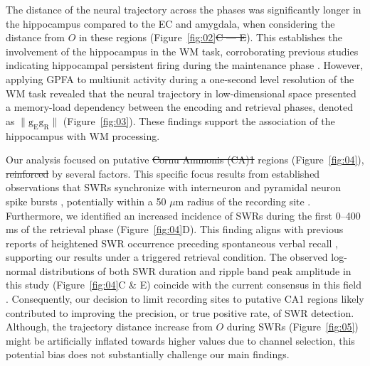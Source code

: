 \documentclass[final,3p,times,twocolumn]{elsarticle}
\providecommand{\DIFaddtex}[1]{{\protect\color{blue}\uwave{#1}}} %
\providecommand{\DIFdeltex}[1]{{\protect\color{red}\sout{#1}}}                      %
\providecommand{\DIFaddbegin}{} %
\providecommand{\DIFaddend}{} %
\providecommand{\DIFdelbegin}{} %
\providecommand{\DIFdelend}{} %
\providecommand{\DIFadd}[1]{\texorpdfstring{\DIFaddtex{#1}}{#1}} %
\providecommand{\DIFdel}[1]{\texorpdfstring{\DIFdeltex{#1}}{}} %
\newcommand{\DIFscaledelfig}{0.5}
\newlength{\DIFdelgraphicswidth} %
\newlength{\DIFdelgraphicsheight} %
\newcommand{\DIFaddincludegraphics}[2][]{{\color{blue}\fbox{\DIFOincludegraphics[#1]{#2}}}} %
\newcommand{\DIFdelincludegraphics}[2][]{%
\sbox{\DIFdelgraphicsbox}{\DIFOincludegraphics[#1]{#2}}%
\settoboxwidth{\DIFdelgraphicswidth}{\DIFdelgraphicsbox} %
\settoboxtotalheight{\DIFdelgraphicsheight}{\DIFdelgraphicsbox} %
\scalebox{\DIFscaledelfig}{%
\parbox[b]{\DIFdelgraphicswidth}{\usebox{\DIFdelgraphicsbox}\\[-\baselineskip] \rule{\DIFdelgraphicswidth}{0em}}\llap{\resizebox{\DIFdelgraphicswidth}{\DIFdelgraphicsheight}{%
\setlength{\unitlength}{\DIFdelgraphicswidth}%
\begin{picture}(1,1)%
\thicklines\linethickness{2pt} %
{\color[rgb]{1,0,0}\put(0,0){\framebox(1,1){}}}%
{\color[rgb]{1,0,0}\put(0,0){\line( 1,1){1}}}%
{\color[rgb]{1,0,0}\put(0,1){\line(1,-1){1}}}%
\end{picture}%
}\hspace*{3pt}}} %
} %
\DeclareRobustCommand{\DIFaddbegin}{\DIFOaddbegin \let\includegraphics\DIFaddincludegraphics} %
\DeclareRobustCommand{\DIFaddend}{\DIFOaddend \let\includegraphics\DIFOincludegraphics} %
\DeclareRobustCommand{\DIFdelbegin}{\DIFOdelbegin \let\includegraphics\DIFdelincludegraphics} %
\DeclareRobustCommand{\DIFdelend}{\DIFOaddend \let\includegraphics\DIFOincludegraphics} %
\begin{document}
The distance of the neural trajectory across the phases was significantly longer in the hippocampus compared to the EC and amygdala, \DIFaddbegin \DIFadd{even }\DIFaddend when considering the distance from $O$ in these regions (Figure~\ref{fig:02}\DIFdelbegin \DIFdel{C --- E}\DIFdelend \DIFaddbegin \DIFadd{C--E}\DIFaddend ). This establishes the involvement of the hippocampus in the WM task, corroborating previous studies indicating hippocampal persistent firing during the maintenance phase \cite{boran_persistent_2019} \cite{kaminski_persistently_2017} \cite{kornblith_persistent_2017} \cite{faraut_dataset_2018}. However, \DIFaddbegin \DIFadd{in the present study, }\DIFaddend applying GPFA to multiunit activity during a one-second level resolution of the WM task revealed that the neural trajectory in low-dimensional space presented a memory-load dependency between the encoding and retrieval phases, denoted as $\mathrm{\lVert g_{E}g_{R} \rVert}$ (Figure~\ref{fig:03}). These findings support the association of the hippocampus with WM processing.

Our analysis focused on putative \DIFdelbegin \DIFdel{Cornu Ammonis (CA)1 }\DIFdelend \DIFaddbegin \DIFadd{CA1 }\DIFaddend regions (Figure~\ref{fig:04}), \DIFdelbegin \DIFdel{reinforced }\DIFdelend \DIFaddbegin \DIFadd{is supported }\DIFaddend by several factors. This specific focus results from established observations that SWRs synchronize with interneuron and pyramidal neuron spike bursts \cite{buzsaki_two-stage_1989} \cite{quyen_cell_2008} \cite{royer_control_2012} \cite{hajos_input-output_2013}, potentially within a 50 $\mu$m radius of the recording site \cite{schomburg_spiking_2012}. Furthermore, we identified an increased incidence of SWRs during the first 0--400 ms of the retrieval phase (Figure~\ref{fig:04}D). This finding aligns with previous reports of heightened SWR occurrence preceding spontaneous verbal recall \cite{norman_hippocampal_2019} \cite{norman_hippocampal_2021}, supporting our results under a triggered retrieval condition. The observed log-normal distributions of both SWR duration and ripple band peak amplitude in this study (Figure~\ref{fig:04}C \& E) coincide with the current consensus in this field \cite{liu_consensus_2022}. Consequently, our decision to limit recording sites to putative CA1 regions likely contributed to improving the precision, or true positive rate, of SWR detection. Although, the trajectory distance increase from $O$ during SWRs (Figure~\ref{fig:05}) might be artificially inflated towards higher values due to channel selection, this potential bias does not substantially challenge our main findings.
\end{document}
